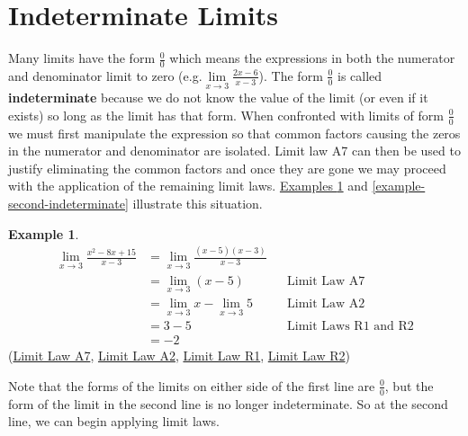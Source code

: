 \documentclass[10pt,oneside,]{book}
\newcommand{\terminology}[1]{\textbf{#1}}
\theoremstyle{plain}
\theoremstyle{definition}
\newtheorem{example}[theorem]{Example}
\numberwithin{equation}{section}
\begin{document}
\section[Indeterminate Limits]{Indeterminate Limits}\label{section-indeterminate-limits}
Many limits have the form \(\frac{0}{0}\) which means the expressions in both the numerator and denominator limit to zero (e.g.\@\(\lim\limits_{x\to3}\frac{2x-6}{x-3}\)). The form \(\frac{0}{0}\) is called \terminology{indeterminate} because we do not know the value of the limit (or even if it exists) so long as the limit has that form. When confronted with limits of form \(\frac{0}{0}\) we must first manipulate the expression so that common factors causing the zeros in the numerator and denominator are isolated. Limit law A7 can then be used to justify eliminating the common factors and once they are gone we may proceed with the application of the remaining limit laws. \hyperref[example-first-indeterminate]{Examples \ref{example-first-indeterminate}} and \hyperref[example-second-indeterminate]{\ref{example-second-indeterminate}} illustrate this situation.%
\begin{example}\label{example-first-indeterminate}
\begin{align*}
\lim_{x\to3}\frac{x^2-8x+15}{x-3}&=\lim_{x\to3}\frac{(x-5)(x-3)}{x-3}\\
&=\lim_{x\to3}(x-5)&&\text{Limit Law A7}\\
&=\lim_{x\to3}x-\lim_{x\to3}5&&\text{Limit Law A2}\\
&=3-5&&\text{Limit Laws R1 and R2}\\
&=-2
\end{align*}(\hyperref[lla7]{Limit Law A7}, \hyperref[lla2]{Limit Law A2}, \hyperref[llr1]{Limit Law R1}, \hyperref[llr2]{Limit Law R2})%
\par
Note that the forms of the limits on either side of the first line are \(\frac{0}{0}\), but the form of the limit in the second line is no longer indeterminate. So at the second line, we can begin applying limit laws.%
\end{example}
\end{document}
